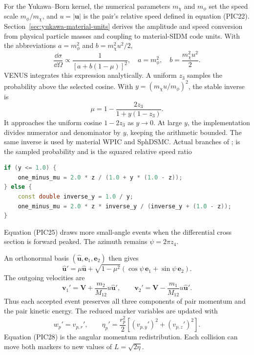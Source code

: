 For the Yukawa--Born kernel, the numerical parameters \(m_\chi\) and
\(m_\phi\) set the speed scale \(m_\phi/m_\chi\), and
\(u=|\bm u|\) is the pair's relative speed defined in equation (PIC22).
Section~\ref{sec:yukawa-material-units} derives the amplitude and speed
conversion from physical particle masses and coupling to material-SIDM code
units.
With the abbreviations \(a=m_\phi^2\) and
\(b=m_\chi^2u^2/2\),
\[
 \frac{\dd\sigma}{\dd\Omega}\propto
 \frac{1}{[a+b(1-\mu)]^2},
 \quad a=m_\phi^2,
 \quad b=\frac{m_\chi^2u^2}{2}.                       \tag{PIC24}
\]
VENUS integrates this expression analytically.  A uniform \(z_3\) samples
the probability above the selected cosine.  With
\(y=(m_\chi u/m_\phi)^2\), the stable inverse is
\[
 \mu=1-\frac{2z_3}{1+y(1-z_3)}.                         \tag{PIC25}
\]
It approaches the uniform cosine \(1-2z_3\) as \(y\to0\).  At large
\(y\), the implementation divides numerator and denominator by \(y\),
keeping the arithmetic bounded.  The same inverse is used by material WPIC
and SphDSMC.
{}
{Actual branches of ;  is the
 sampled probability and  is the squared relative speed ratio}
\begin{lstlisting}[language=C++]
if (y <= 1.0) {
    one_minus_mu = 2.0 * z / (1.0 + y * (1.0 - z));
} else {
    const double inverse_y = 1.0 / y;
    one_minus_mu = 2.0 * z * inverse_y / (inverse_y + (1.0 - z));
}
\end{lstlisting}
Equation (PIC25) draws more small-angle events when the differential cross
section is forward peaked.  The azimuth remains \(\psi=2\pi z_4\).

An orthonormal basis \((\widehat{\bm u},\bm e_1,\bm e_2)\) then gives
\[
 \widehat{\bm u}'=
 \mu\widehat{\bm u}
 +\sqrt{1-\mu^2}\left(\cos\psi\,\bm e_1
 +\sin\psi\,\bm e_2\right).                           \tag{PIC26}
\]
The outgoing velocities are
\[
 \bm v_1'=\bm V+\frac{m_2}{M_{12}}u\widehat{\bm u}',
 \qquad
 \bm v_2'=\bm V-\frac{m_1}{M_{12}}u\widehat{\bm u}'.  \tag{PIC27}
\]
Thus each accepted event preserves all three components of pair momentum and
the pair kinetic energy.  The reduced marker variables are updated with
\[
 w_p'=v_{p,r}',
 \qquad
 \eta_p'=\frac{r_p^2}{2}\left[(v_{p,y}')^2+(v_{p,z}')^2\right]. \tag{PIC28}
\]
Equation (PIC28) is the angular momentum redistribution.  Each collision can
move both markers to new values of \(L=\sqrt{2\eta}\).

